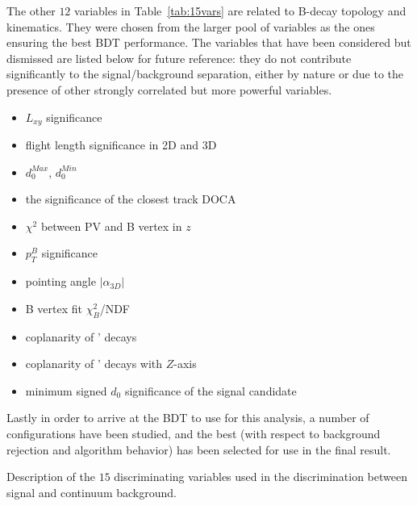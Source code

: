 The other $12$ variables in Table~\ref{tab:15vars} are related to B-decay topology and
kinematics. They were chosen from the larger pool of variables as the ones ensuring
the best BDT performance.
The variables that have been considered but dismissed are listed below for future
reference: they do not contribute significantly to the signal/background separation,
either by nature or due to the presence of other strongly correlated but more powerful
variables.
   
\begin{itemize}
\setlength{\itemsep}{0pt}%
\setlength{\parskip}{0pt}%
\item $L_{xy}$ significance
\item flight length significance in 2D and 3D
\item $d_0^{Max}$, $d_0^{Min}$
\item the significance of the closest track DOCA
\item $\chi^2$ between PV and B vertex in $z$ 
\item $p_{T}^{B}$ significance
\item   pointing angle $|\alpha_{3D}|$
\item B vertex fit $\chi^2_B$/NDF
\item coplanarity of \Bsmumu' decays
\item coplanarity of \Bsmumu' decays with $Z$-axis
\item minimum signed $d_0$ significance of the signal candidate
\end{itemize}
Lastly in order to arrive at the BDT to
use for this analysis, a number of configurations have been studied, and
the best (with respect to background rejection and algorithm behavior)
has been selected for use in the final result.
 
\begin{table}[!htb]
\begin{center}

\caption{Description of the $15$ discriminating variables used in the
discrimination between signal and continuum background.}
\label{tab:15vars}
\end{center}
\end{table}

